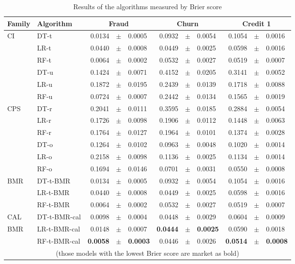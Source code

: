  \begin{table}[!t]
    \centering
    \footnotesize
    \begin{tabular}{l l r@{\hskip 0in}c@{\hskip 0in}l r@{\hskip 0in}c@{\hskip 0in}l r@{\hskip 
    0in}c@{\hskip 0in}l  } %
    \hline
    \bf{Family} & \bf{Algorithm} & \multicolumn{3}{c}{\bf{Fraud}} & 
    \multicolumn{3}{c}{\bf{Churn}} & \multicolumn{3}{c}{\bf{Credit 1}} \\ 
    \hline
CI&DT-t & 0.0134 &$\pm$& 0.0005 & 0.0932 &$\pm$& 0.0054 & 0.1054 &$\pm$& 0.0016\\ 
&LR-t & 0.0440 &$\pm$& 0.0008 & 0.0449 &$\pm$& 0.0025 & 0.0598 &$\pm$& 0.0016\\ 
&RF-t & 0.0064 &$\pm$& 0.0002 & 0.0532 &$\pm$& 0.0027 & 0.0519 &$\pm$& 0.0007\\ 
&DT-u & 0.1424 &$\pm$& 0.0071 & 0.4152 &$\pm$& 0.0205 & 0.3141 &$\pm$& 0.0052\\ 
&LR-u & 0.1872 &$\pm$& 0.0195 & 0.2439 &$\pm$& 0.0139 & 0.1718 &$\pm$& 0.0088\\ 
&RF-u & 0.0724 &$\pm$& 0.0007 & 0.2442 &$\pm$& 0.0134 & 0.1565 &$\pm$& 0.0019\\ 
\hline 
CPS&DT-r & 0.2041 &$\pm$& 0.0111 & 0.3595 &$\pm$& 0.0185 & 0.2884 &$\pm$& 0.0054\\ 
&LR-r & 0.1726 &$\pm$& 0.0098 & 0.1906 &$\pm$& 0.0112 & 0.1448 &$\pm$& 0.0063\\ 
&RF-r & 0.1764 &$\pm$& 0.0127 & 0.1964 &$\pm$& 0.0101 & 0.1374 &$\pm$& 0.0028\\ 
&DT-o & 0.1264 &$\pm$& 0.0102 & 0.0963 &$\pm$& 0.0048 & 0.1020 &$\pm$& 0.0014\\ 
&LR-o & 0.2158 &$\pm$& 0.0098 & 0.1136 &$\pm$& 0.0025 & 0.1134 &$\pm$& 0.0014\\ 
&RF-o & 0.1694 &$\pm$& 0.0146 & 0.0701 &$\pm$& 0.0031 & 0.0550 &$\pm$& 0.0008\\ 
\hline 
BMR&DT-t-BMR & 0.0134 &$\pm$& 0.0005 & 0.0932 &$\pm$& 0.0054 & 0.1054 &$\pm$& 0.0016\\ 
&LR-t-BMR & 0.0440 &$\pm$& 0.0008 & 0.0449 &$\pm$& 0.0025 & 0.0598 &$\pm$& 0.0016\\ 
&RF-t-BMR & 0.0064 &$\pm$& 0.0002 & 0.0532 &$\pm$& 0.0027 & 0.0519 &$\pm$& 0.0007\\ 
\hline 
CAL&DT-t-BMR-cal & 0.0098 &$\pm$& 0.0004 & 0.0448 &$\pm$& 0.0029 & 0.0604 &$\pm$& 0.0009\\ 
BMR&LR-t-BMR-cal & 0.0148 &$\pm$& 0.0007 & \bf{0.0444} &\bf{$\pm$}& \bf{0.0025} & 0.0590 &$\pm$& 
0.0018\\ 
&RF-t-BMR-cal & \bf{0.0058} &\bf{$\pm$}& \bf{0.0003} & 0.0446 &$\pm$& 0.0026 & \bf{0.0514} 
&\bf{$\pm$}& \bf{0.0008}\\ 
\hline
  \multicolumn{11}{c}{(those models with the lowest Brier score are market as bold)}
  \end{tabular}
    \caption{Results of the algorithms measured by Brier score}
    \label{tab:6:results_brier}
\end{table}


